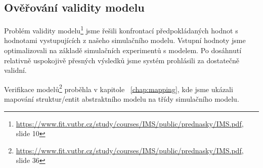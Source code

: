 \subsection{Ověřování validity modelu}

Problém validity modelu\footnote{\url{https://www.fit.vutbr.cz/study/courses/IMS/public/prednasky/IMS.pdf}, slide 10} jsme řešili konfrontací předpokládaných hodnot s hodnotami vystupujících z našeho simulačního modelu.
Vstupní hodnoty jsme optimalizovali na základě simulačních experimentů s modelem. Po dosáhnutí relativně uspokojivě přesných výsledků jsme systém prohlásili za dostatečně validní.

Verifikace modelů\footnote{\url{https://www.fit.vutbr.cz/study/courses/IMS/public/prednasky/IMS.pdf}, slide 36} proběhla v kapitole ~\ref{chap:mapping}, kde jsme ukázali mapování struktur/entit abstraktního modelu na třídy simulačního modelu.
